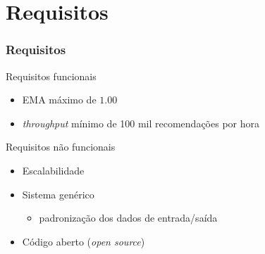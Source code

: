 \section[Requisitos]{Requisitos}
\begin{frame}
\frametitle{Requisitos}
\begin{block}{Requisitos funcionais}
\begin{itemize}
	\item EMA máximo de $1.00$  
	\item \textit{throughput} mínimo de 100 mil recomendações por hora
\end{itemize}
\end{block}

\begin{block}{Requisitos não funcionais}
\begin{itemize}
	\item Escalabilidade
	\item Sistema genérico
	\begin{itemize}
		\item padronização dos dados de entrada/saída
	\end{itemize}
	\item Código aberto (\textit{open source})
\end{itemize}
\end{block}
\end{frame}
